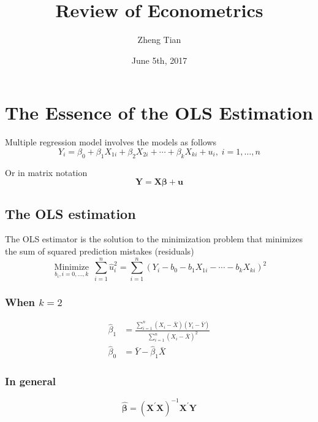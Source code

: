 \documentclass[a4paper,10pt]{article}
\author{Zheng Tian}
\date{June 5th, 2017}
\title{Review of Econometrics}
\begin{document}
\maketitle

\section{The Essence of the OLS Estimation}
\label{sec:orgb88d612}
Multiple regression model involves the models as follows
\begin{equation}
\label{eq:multi-regress-1}
Y_i = \beta_0 + \beta_1 X_{1i} + \beta_2 X_{2i} + \cdots + \beta_k X_{ki} + u_i,\; i = 1, \ldots, n
\end{equation}

Or in matrix notation
\begin{equation}
\label{eq:multi-regress-m}
\mathbf{Y} = \mathbf{X} \boldsymbol{\beta} + \mathbf{u}
\end{equation}

\subsection{The OLS estimation}
\label{sec:org3024f6b}

The OLS estimator is the solution to the minimization problem that
minimizes the sum of squared prediction mistakes (residuals)
\begin{equation}
\label{eq:ols-multi-regress}
\operatorname*{Minimize}_{b_i,i=0,\dotsc,k}\: \sum_{i=1}^n \hat{u}_i^2 = \sum_{i=1}^n (Y_i - b_0 - b_1 X_{1i} - \cdots - b_k X_{ki})^2
\end{equation}

\subsubsection*{When \(k = 2\)}
\label{sec:org709a7b3}
\begin{align}
\hat{\beta}_1 & = \frac{\sum_{i=1}^n (X_i - \bar{X})(Y_i - \bar{Y})}{\sum_{i=1}^n (X_i - \bar{X})^2}  \label{eq:betahat-1} \\
\hat{\beta}_0 & = \bar{Y} - \hat{\beta}_1 \bar{X}  \label{eq:betahat-0}
\end{align}

\subsubsection*{In general}
\label{sec:org91bd64b}
\begin{equation}
\label{eq:betahat-mult}
\boldsymbol{\hat{\beta}} = (\mathbf{X}^{\prime} \mathbf{X})^{-1} \mathbf{X}^{\prime} \mathbf{Y}
\end{equation}
\end{document}
